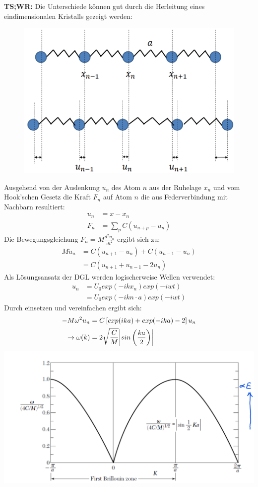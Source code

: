 \textbf{TS;WR:} Die Unterschiede können gut durch die Herleitung eines eindimensionalen Kristalls gezeigt werden:\\
\begin{minipage}[t]{0.44\textwidth}
    \centering
    \begin{figure}[H]
        \includegraphics[width=0.7\linewidth]{resources/16-03-2012/q49_same_mass.png}
    \end{figure}
    Ausgehend von der Auslenkung $u_n$ des Atom $n$ aus der Ruhelage $x_n$ und vom Hook'schen Gesetz die Kraft $F_n$ auf Atom $n$ die aus Federverbindung mit Nachbarn resultiert:
    \begin{align*}
        u_n &= x - x_n\\
        F_n &= \sum_{p} C \left(u_{n+p} - u_n\right)
    \end{align*}
    Die Bewegungsgleichung $F_n = M \frac{d^2 u_n}{dt^2}$ ergibt sich zu:
    \begin{align*}
        M \ddot{u}_n &= C\left(u_{n+1} - u_n\right) + C\left(u_{n-1} - u_n\right)\\
        &= C\left(u_{n+1} + u_{n-1} - 2u_n\right)
    \end{align*}
    Als Lösungsansatz der DGL werden logischerweise Wellen verwendet:
    \begin{align*}
        u_n &= U_0 exp(-ikx_n)exp(-iwt)\\
            &= U_0 exp(-ikn\cdot a)exp(-iwt)
    \end{align*}
    Durch einsetzen und vereinfachen ergibt sich:
    \begin{align*}
        -M \omega^2 u_n &= C\left[exp(ika) + exp(-ika) - 2\right] u_n\\
        \rightarrow \omega(k) &= 2 \sqrt{\frac{C}{M}} \abs{sin\left(\frac{ka}{2}\right)}
    \end{align*}
    \includegraphics[width=0.9\linewidth]{resources/16-03-2012/q49_same_mass_disp.png}

\end{minipage}
